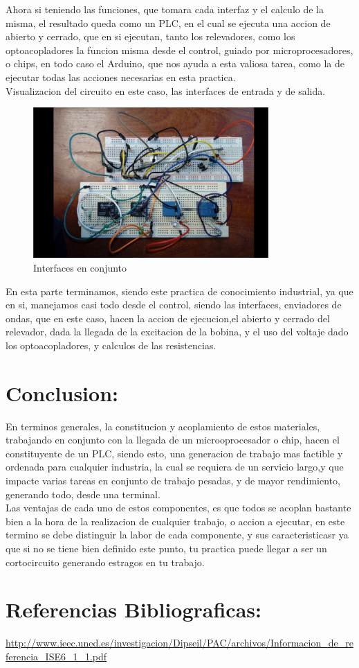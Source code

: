 \documentclass[12pt,a4paper]{article}
\begin{document}
Ahora si teniendo las funciones, que tomara cada interfaz y el calculo de la misma, el resultado queda como un PLC, en el cual se ejecuta una accion de abierto y cerrado, que en si ejecutan, tanto los relevadores, como los optoacopladores la funcion misma desde el control, guiado por microprocesadores, o chips, en todo caso el Arduino, que nos ayuda a esta valiosa tarea, como la de ejecutar todas las acciones necesarias en esta practica.\\
Visualizacion del circuito en este caso, las interfaces de entrada y de salida.\\

\begin{figure}[hbtp]
\centering
\includegraphics[width=9cm]{Interfaz.png}
\caption{Interfaces en conjunto}
\end{figure}


En esta parte terminamos, siendo este practica de conocimiento industrial, ya que en si, manejamos casi todo desde el control, siendo las interfaces, enviadores de ondas, que en este caso, hacen la accion de ejecucion,el abierto y cerrado del relevador, dada la llegada de la excitacion de la bobina, y el uso del voltaje dado los optoacopladores, y calculos de las resistencias.

\section{Conclusion:}

En terminos generales, la constitucion y acoplamiento de estos materiales, trabajando en conjunto con la llegada de un microoprocesador o chip, hacen el constituyente de un PLC, siendo esto, una generacion de trabajo mas factible y ordenada para cualquier industria, la cual se requiera de un servicio largo,y que impacte varias tareas en conjunto de trabajo pesadas, y de mayor rendimiento, generando todo, desde una terminal.\\
Las ventajas de cada uno de estos componentes, es que todos se acoplan bastante bien a la hora de la realizacion de cualquier trabajo, o accion a ejecutar, en este termino se debe distinguir la labor de cada componente, y sus caracteristicasr ya que si no se tiene bien definido este punto, tu practica puede llegar a ser un cortocircuito generando estragos en tu trabajo.

\section{Referencias Bibliograficas:}
\url{http://www.ieec.uned.es/investigacion/Dipseil/PAC/archivos/Informacion_de_referencia_ISE6_1_1.pdf}
\end{document}
